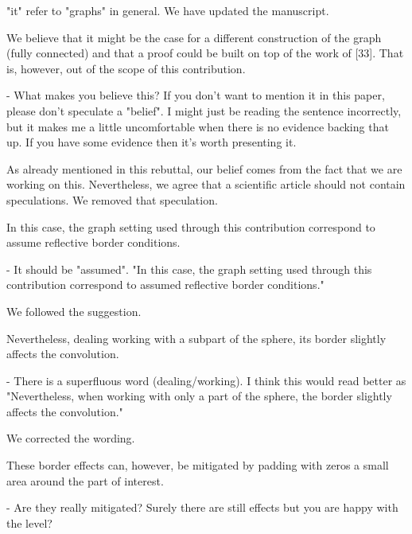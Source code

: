 \documentclass[12pt,a4paper]{article}
\newcommand{\1}{\b{1}}              %
\newcommand{\0}{\b{0}}              %
\begin{document}
"it" refer to "graphs" in general. We have updated the manuscript.

\begin{mdframed}[style=comment]
We believe that it might be the case for a different construction of the graph (fully connected) and that a proof could be built on top of the work of [33]. That is, however, out of the scope of this contribution.

- What makes you believe this? If you don't want to mention it in this paper, please don't speculate a "belief". I might just be reading the sentence incorrectly, but it makes me a little uncomfortable when there is no evidence backing that up. If you have some evidence then it's worth presenting it.
\end{mdframed}

As already mentioned in this rebuttal, our belief comes from the fact that we are working on this.
Nevertheless, we agree that a scientific article should not contain speculations.
We removed that speculation.

\begin{mdframed}[style=comment]
In this case, the graph setting used through this contribution correspond to assume reflective border conditions.

- It should be "assumed". "In this case, the graph setting used through this contribution correspond to assumed reflective border conditions."
\end{mdframed}

We followed the suggestion.

\begin{mdframed}[style=comment]
Nevertheless, dealing working with a subpart of the sphere, its border slightly affects the convolution.

- There is a superfluous word (dealing/working). I think this would read better as "Nevertheless, when working with only a part of the sphere, the border slightly affects the convolution."
\end{mdframed}

We corrected the wording.

\begin{mdframed}[style=comment]
These border effects can, however, be mitigated by padding with zeros a small area around the part of interest.

- Are they really mitigated? Surely there are still effects but you are happy with the level?
\end{mdframed}
\end{document}
